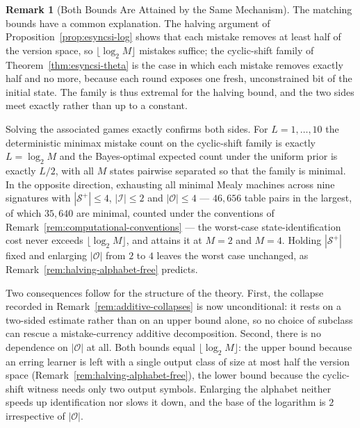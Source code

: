 \documentclass[12pt]{article}
\theoremstyle{definition}
\newtheorem{remark}[theorem]{Remark}
\newcommand{\Splus}{\mathcal S^{+}}
\begin{document}
\begin{remark}[Both Bounds Are Attained by the Same Mechanism]
\label{rem:esyncsi-tight}
The matching bounds have a common explanation.  The halving argument of
Proposition~\ref{prop:esyncsi-log} shows that each mistake removes at least
half of the version space, so $\lfloor\log_2M\rfloor$ mistakes suffice; the
cyclic-shift family of Theorem~\ref{thm:esyncsi-theta} is the case in which
each mistake removes exactly half and no more, because each round exposes one
fresh, unconstrained bit of the initial state.  The family is thus extremal for
the halving bound, and the two sides meet exactly rather than up to a
constant.

Solving the associated games exactly confirms both sides.  For
$L=1,\dots,10$ the deterministic minimax mistake count on the cyclic-shift
family is exactly $L=\log_2M$ and the Bayes-optimal expected count under the
uniform prior is exactly $L/2$, with all $M$ states pairwise separated so that
the family is minimal.  In the opposite direction, exhausting all minimal Mealy
machines across nine signatures with $|\Splus|\le4$, $|\mathcal I|\le2$ and
$|\mathcal O|\le4$ --- $46{,}656$ table pairs in the largest, of which
$35{,}640$ are minimal, counted under the conventions of
Remark~\ref{rem:computational-conventions} --- the worst-case state-identification cost never
exceeds $\lfloor\log_2M\rfloor$, and attains it at $M=2$ and $M=4$.  Holding
$|\Splus|$ fixed and enlarging $|\mathcal O|$ from $2$ to $4$ leaves the worst
case unchanged, as Remark~\ref{rem:halving-alphabet-free} predicts.

Two consequences follow for the structure of the theory.  First, the collapse
recorded in Remark~\ref{rem:additive-collapses} is now unconditional: it rests
on a two-sided estimate rather than on an upper bound alone, so no choice of
subclass can rescue a mistake-currency additive decomposition.  Second, there
is no dependence on $|\mathcal O|$ at all.  Both bounds equal
$\lfloor\log_2M\rfloor$: the upper bound because an erring learner is left with
a single output class of size at most half the version space
(Remark~\ref{rem:halving-alphabet-free}), the lower bound because the
cyclic-shift witness needs only two output symbols.  Enlarging the alphabet
neither speeds up identification nor slows it down, and the base of the
logarithm is $2$ irrespective of $|\mathcal O|$.
\end{remark}
\end{document}
